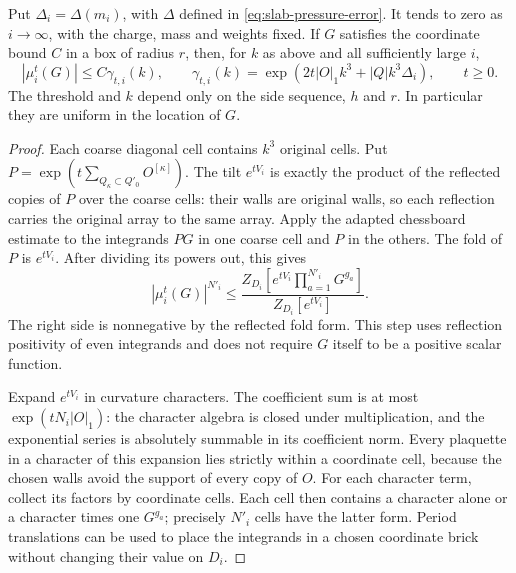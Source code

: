 \begin{proposition}\label{thm:diag-amplification}
Put $\Delta_i=\Delta(m_i)$, with $\Delta$ defined in
\eqref{eq:slab-pressure-error}. It tends to zero as $i\to\infty$,
with the charge, mass and weights fixed.
If $G$ satisfies the coordinate bound $C$ in a box of radius $r$,
then, for $k$ as above and all sufficiently large $i$,
\begin{equation}\label{eq:diag-amplification}
 |\mu_i^t(G)|\le C\gamma_{t,i}(k),\qquad
 \gamma_{t,i}(k)=
      \exp(2t|O|_1k^3+|Q|k^3\Delta_i),\qquad t\ge0.
\end{equation}
The threshold and $k$ depend only on the side sequence, $h$ and
$r$. In particular they are uniform in the location of $G$.
\end{proposition}

\begin{proof}
Each coarse diagonal cell contains $k^3$ original cells. Put
$P=\exp(t\sum_{Q_\kappa\subset Q'_0}O^{[\kappa]})$. The tilt
$e^{tV_i}$ is exactly the product of the reflected copies of $P$
over the coarse cells: their walls are original walls, so each
reflection carries the original array to the same array. Apply
the adapted chessboard estimate to the integrands $PG$ in one
coarse cell and $P$ in the others. The fold of $P$ is $e^{tV_i}$.
After dividing its powers out, this gives
\begin{equation}\label{eq:diag-amplified-power}
 |\mu_i^t(G)|^{N'_i}
 \le\frac{Z_{D_i}[e^{tV_i}\prod_{a=1}^{N'_i}G^{g_a}]}
              {Z_{D_i}[e^{tV_i}]}.
\end{equation}
The right side is nonnegative by the reflected fold form. This
step uses reflection positivity of even integrands and does not
require $G$ itself to be a positive scalar function.

Expand $e^{tV_i}$ in curvature characters. The coefficient sum
is at most $\exp(tN_i|O|_1)$: the character algebra is closed
under multiplication, and the exponential series is absolutely
summable in its coefficient norm. Every plaquette in a character
of this expansion lies strictly within a coordinate cell,
because the chosen walls avoid the support of every copy of $O$.
For each character term, collect its factors by coordinate cells.
Each cell then contains a character alone or a character times
one $G^{g_a}$; precisely $N'_i$ cells have the latter form. Period
translations can be used to place the integrands in a chosen
coordinate brick without changing their value on $D_i$.


\end{proof}

